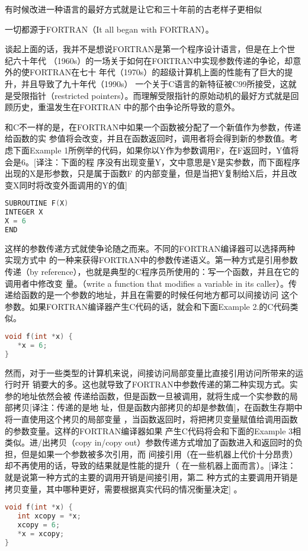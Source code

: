 \documentclass[a4paper,11pt]{book}
\begin{document}
有时候改进一种语言的最好方式就是让它和三十年前的古老样子更相似

一切都源于FORTRAN（It all began with FORTRAN）。

谈起上面的话，我并不是想说FORTRAN是第一个程序设计语言，但是在上个世纪六十年代
（1960s）的一场关于如何在FORTRAN中实现参数传递的争论，却意外的使FORTRAN在七十
年代（1970s）的超级计算机上面的性能有了巨大的提升，并且导致了九十年代（1990s）
一个关于C语言的新特征被C99所接受，这就是受限指针（restricted
pointers）。而理解受限指针的原始动机的最好方式就是回顾历史，重温发生在FORTRAN
中的那个由争论所导致的意外。

和C不一样的是，在FORTRAN中如果一个函数被分配了一个新值作为参数，传递给函数的实
参值将会改变，并且在函数返回时，调用者将会得到新的参数值。考虑下面Example
1所例举的代码，如果你以Y作为参数调用F，在F返回时，Y值将会是6。[译注：下面的程
序没有出现变量Y，文中意思是Y是实参数，而下面程序出现的X是形参数，只是属于函数F
的内部变量，但是当把Y复制给X后，并且改变X同时将改变外面调用的Y的值]

\begin{lstlisting}[language=c, caption='Example 1']
SUBROUTINE F(X)
INTEGER X
X = 6
END
\end{lstlisting}
这样的参数传递方式就使争论随之而来。不同的FORTRAN编译器可以选择两种实现方式中
的一种来获得FORTRAN中的参数传递语义。第一种方式是引用参数传递（by
reference），也就是典型的C程序员所使用的：写一个函数，并且在它的调用者中修改变
量。（write a function that modifies a variable in its
caller）。传递给函数的是一个参数的地址，并且在需要的时候任何地方都可以间接访问
这个参数。如果FORTRAN编译器产生C代码的话，就会和下面Example 2.的C代码类似。

\begin{lstlisting}[language=c, caption='Example 2:']
void f(int *x) {
   *x = 6;
}
\end{lstlisting}

然而，对于一些类型的计算机来说，间接访问局部变量比直接引用访问所带来的运行时开
销要大的多。这也就导致了FORTRAN中参数传递的第二种实现方式。实参的地址依然会被
传递给函数，但是函数一旦被调用，就将生成一个实参数的局部拷贝[译注：传递的是地
址，但是函数内部拷贝的却是参数值]，在函数生存期中将一直使用这个拷贝的局部变量
，当函数返回时，将把拷贝变量赋值给调用函数的参数变量。这样的FORTRAN编译器如果
产生C代码将会和下面的Example 3相类似。进/出拷贝（copy in/copy
out）参数传递方式增加了函数进入和返回时的负担，但是如果一个参数被多次引用，而
间接引用（在一些机器上代价十分昂贵）却不再使用的话，导致的结果就是性能的提升（
在一些机器上面而言）。[译注：就是说第一种方式的主要的调用开销是间接引用，第二
种方式的主要调用开销是拷贝变量，其中哪种更好，需要根据真实代码的情况衡量决定]
。
\begin{lstlisting}[language=c,caption='Example 3:']
void f(int *x) {
   int xcopy = *x;
   xcopy = 6;
   *x = xcopy;
}
\end{lstlisting}
\end{document}
